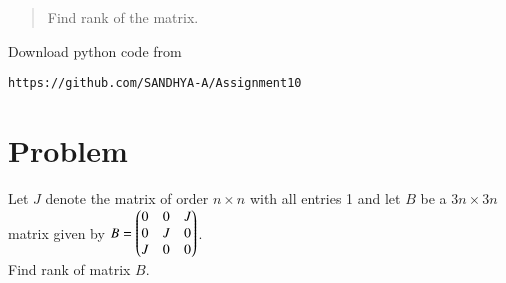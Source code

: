 \documentclass[journal,12pt,twocolumn]{IEEEtran}
\begin{document}
\author{\\
 \\
AI20RESCH14001\\
 }

\maketitle
\begin{abstract}
Find rank of the matrix.
\end{abstract}
Download  python code from 
\begin{lstlisting}
https://github.com/SANDHYA-A/Assignment10
\end{lstlisting}
\section{Problem}
Let $J$ denote the matrix of order $n \times n$ with all
entries 1 and let $B$ be a $3n \times 3n$ matrix given by
$B = \begin{pmatrix}0&0&J\\0&J&0\\J&0&0\end{pmatrix}$. \\
Find rank of matrix $B$.
\end{document}
